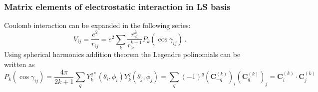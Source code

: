 \documentclass[a4paper,oneside,12pt]{extarticle}
\begin{document}
\subsubsection {Matrix elements of electrostatic interaction in LS basis}
%
\label{ssec:H_ES}
%
Coulomb interaction can be expanded in the following series:
$$
V_{ij} = \frac{e^2}{r_{ij}} = e^2 \sum_k \frac{r_<^k}{r_>^{k+1}} P_k(\cos\gamma_{ij}) \,.
$$
Using spherical harmonics addition theorem the Legendre polinomials can be written as
$$
P_k(\cos\gamma_{ij}) = \frac{4\pi}{2k+1} \sum_q Y_k^{q*}(\theta_i,\phi_i) Y_k^q(\theta_j,\phi_j) =
\sum_q (-1)^q  (\mathbf{C}^{(k)}_{-q})_i (\mathbf{C}^{(k)}_q)_j = \mathbf{C}^{(k)}_i \cdot \mathbf{C}^{(k)}_j
$$
\end{document}
